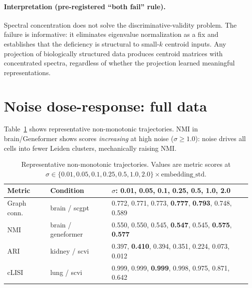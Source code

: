\documentclass[11pt]{article}
\begin{document}
\paragraph{Interpretation (pre-registered ``both fail'' rule).} Spectral
concentration does not solve the discriminative-validity problem. The
failure is informative: it eliminates eigenvalue normalization as a fix
and establishes that the deficiency is structural to small-$k$ centroid
inputs. Any projection of biologically structured data produces
centroid matrices with concentrated spectra, regardless of whether the
projection learned meaningful representations.


\section{Noise dose-response: full data}
\label{app:noise}

Table~\ref{tab:app_noise_fail} shows representative non-monotonic
trajectories. NMI in brain/Geneformer shows scores \emph{increasing} at
high noise ($\sigma \geq 1.0$): noise drives all cells into fewer
Leiden clusters, mechanically raising NMI.

\begin{table}[h!]
\centering
\caption{Representative non-monotonic trajectories. Values are metric
scores at $\sigma \in \{0.01, 0.05, 0.1, 0.25, 0.5, 1.0, 2.0\} \times
\text{embedding\_std}$.}
\label{tab:app_noise_fail}
\footnotesize
\begin{tabular}{@{}llp{}@{}}
\toprule
Metric & Condition & $\sigma$: 0.01, 0.05, 0.1, 0.25, 0.5, 1.0, 2.0 \\
\midrule
Graph conn. & brain / scgpt & 0.772, 0.771, 0.773, \textbf{0.777}, \textbf{0.793}, 0.748, 0.589 \\
NMI & brain / geneformer & 0.550, 0.550, 0.545, \textbf{0.547}, 0.545, \textbf{0.575}, \textbf{0.577} \\
ARI & kidney / scvi & 0.397, \textbf{0.410}, 0.394, 0.351, 0.224, 0.073, 0.012 \\
cLISI & lung / scvi & 0.999, 0.999, \textbf{0.999}, 0.998, 0.975, 0.871, 0.642 \\
\bottomrule
\end{tabular}
\end{table}




\end{document}
